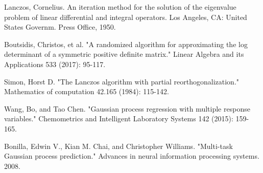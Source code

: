 \documentclass{article}
\begin{document}
\begin{thebibliography}{1}
Lanczos, Cornelius. An iteration method for the solution of the eigenvalue problem of linear differential and integral operators. Los Angeles, CA: United States Governm. Press Office, 1950.

Boutsidis, Christos, et al. "A randomized algorithm for approximating the log determinant of a symmetric positive definite matrix." Linear Algebra and its Applications 533 (2017): 95-117.

Simon, Horst D. "The Lanczos algorithm with partial reorthogonalization." Mathematics of computation 42.165 (1984): 115-142.

Wang, Bo, and Tao Chen. "Gaussian process regression with multiple response variables." Chemometrics and Intelligent Laboratory Systems 142 (2015): 159-165.

Bonilla, Edwin V., Kian M. Chai, and Christopher Williams. "Multi-task Gaussian process prediction." Advances in neural information processing systems. 2008.
\end{thebibliography}
\end{document}
